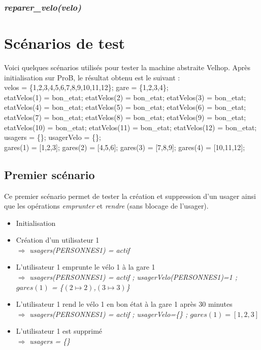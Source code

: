 \documentclass[12pt]{article}
\begin{document}
\subsubsection{\textit{reparer\_velo(velo)}}
\newpage
\section{Scénarios de test}
Voici quelques scénarios utilisés pour tester la machine abstraite Velhop. Après initialisation sur ProB, le résultat obtenu est le suivant : \\
velos = \{1,2,3,4,5,6,7,8,9,10,11,12\};
gare = \{1,2,3,4\}; \\
etatVelos(1) = bon\_etat;
etatVelos(2) = bon\_etat;
etatVelos(3) = bon\_etat;
etatVelos(4) = bon\_etat;
etatVelos(5) = bon\_etat;
etatVelos(6) = bon\_etat;
etatVelos(7) = bon\_etat;
etatVelos(8) = bon\_etat;
etatVelos(9) = bon\_etat;
etatVelos(10) = bon\_etat;
etatVelos(11) = bon\_etat;
etatVelos(12) = bon\_etat;  \\
usagers = \{\};
usagerVelo = \{\}; \\
gares(1) = [1,2,3];
gares(2) = [4,5,6];
gares(3) = [7,8,9];
gares(4) = [10,11,12];
\subsection{Premier scénario}
Ce premier scénario permet de tester la création et suppression d'un usager ainsi que les opérations \textit{emprunter} et \textit{rendre} (sans blocage de l'usager).
\begin{itemize}
  \item Initialisation
  \item Création d'un utilisateur 1 \\
  $\Rightarrow$ \textit{usagers(PERSONNES1) = actif}
  \item L'utilisateur 1 emprunte le vélo 1 à la gare 1 \\
  $\Rightarrow$ \textit{usagers(PERSONNES1) = actif ; usagerVelo(PERSONNES1)=1 ; $gares(1)$ = \{$(2\mapsto2)$,$(3\mapsto3)$\}}
  \item L'utilisateur 1 rend le vélo 1 en bon état à la gare 1 après 30 minutes \\
  $\Rightarrow$ \textit{usagers(PERSONNES1) = actif ; usagerVelo=\{\} ; $gares(1) = [1,2,3]$}
  \item L'utilisateur 1 est supprimé \\
  $\Rightarrow$ \textit{usagers = \{\}}
\end{itemize}
\end{document}
